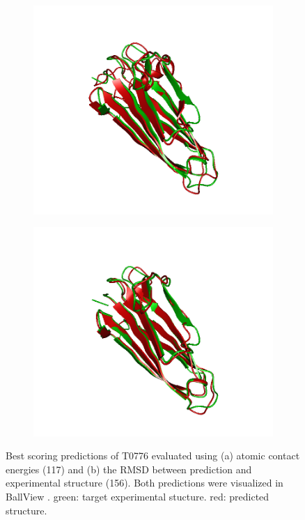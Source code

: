 \documentclass[11pt,a4paper]{article}
\renewcommand{\(}{\left (}
\renewcommand{\)}{\right )}
\begin{document}
\begin{figure}[!h]
	\begin{subfigure}{.5\textwidth}
		\includegraphics[width=\textwidth]{figures/T0784TS117}
		\subcaption{}
	\end{subfigure}
	\begin{subfigure}{.5\textwidth}
		\includegraphics[width=\textwidth]{figures/T0784TS156}
		\subcaption{}
	\end{subfigure}
	\caption{Best scoring predictions of T0776 evaluated using (a) atomic contact energies (117) and (b) the RMSD between prediction and experimental structure (156). Both predictions were visualized in BallView \citep{ballview}. green: target experimental stucture. red: predicted structure.}
\end{figure}
\end{document}
